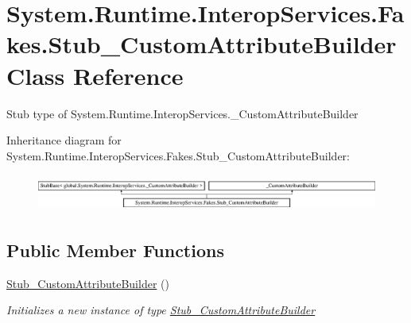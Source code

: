 \hypertarget{class_system_1_1_runtime_1_1_interop_services_1_1_fakes_1_1_stub___custom_attribute_builder}{\section{System.\-Runtime.\-Interop\-Services.\-Fakes.\-Stub\-\_\-\-Custom\-Attribute\-Builder Class Reference}
\label{class_system_1_1_runtime_1_1_interop_services_1_1_fakes_1_1_stub___custom_attribute_builder}
}


Stub type of System.\-Runtime.\-Interop\-Services.\-\_\-\-Custom\-Attribute\-Builder 


Inheritance diagram for System.\-Runtime.\-Interop\-Services.\-Fakes.\-Stub\-\_\-\-Custom\-Attribute\-Builder\-:\begin{figure}[H]
\begin{center}
\leavevmode
\includegraphics[height=1.230769cm]{class_system_1_1_runtime_1_1_interop_services_1_1_fakes_1_1_stub___custom_attribute_builder}
\end{center}
\end{figure}
\subsection*{Public Member Functions}
\begin{DoxyCompactItemize}
\item 
\hyperlink{class_system_1_1_runtime_1_1_interop_services_1_1_fakes_1_1_stub___custom_attribute_builder_a26f73029cb00a4b602becdf579c0714b}{Stub\-\_\-\-Custom\-Attribute\-Builder} ()
\begin{DoxyCompactList}\small\item\em Initializes a new instance of type \hyperlink{class_system_1_1_runtime_1_1_interop_services_1_1_fakes_1_1_stub___custom_attribute_builder}{Stub\-\_\-\-Custom\-Attribute\-Builder}\end{DoxyCompactList}\end{DoxyCompactItemize}
